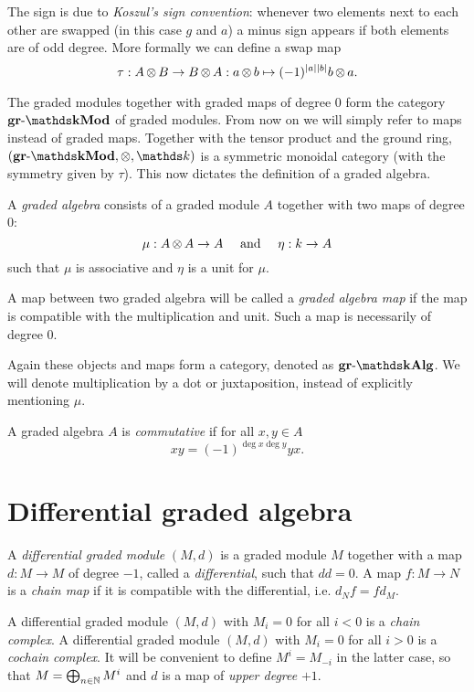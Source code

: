 The sign is due to \emph{Koszul's sign convention}: whenever two elements next to each other are swapped (in this case $g$ and $a$) a minus sign appears if both elements are of odd degree. More formally we can define a swap map
$$ \tau : A \operatorname*{\otimes} B \to B \operatorname*{\otimes} A : a \operatorname*{\otimes} b \mapsto (-1)^{{|{a}|}{|{b}|}} b \operatorname*{\otimes} a. $$

The graded modules together with graded maps of degree $0$ form the category $\grMod{\k}$ of graded modules. From now on we will simply refer to maps instead of graded maps. Together with the tensor product and the ground ring, $(\grMod{\k}, \tensor, \k)$ is a symmetric monoidal category (with the symmetry given by $\tau$). This now dictates the definition of a graded algebra.

\begin{definition}
	A \emph{graded algebra} consists of a graded module $A$ together with two maps of degree $0$:
	$$ \mu: A \operatorname*{\otimes} A \to A \quad\text{ and }\quad \eta: k \to A $$
	such that $\mu$ is associative and $\eta$ is a unit for $\mu$.

	A map between two graded algebra will be called a \emph{graded algebra map} if the map is compatible with the multiplication and unit. Such a map is necessarily of degree $0$.
\end{definition}

Again these objects and maps form a category, denoted as $\grAlg{\k}$. We will denote multiplication by a dot or juxtaposition, instead of explicitly mentioning $\mu$.

\begin{definition}
	A graded algebra $A$ is \emph{commutative} if for all $x, y \in A$
	$$ x y = (-1)^{\deg{x}\deg{y}} y x. $$
\end{definition}


\section{Differential graded algebra}

\begin{definition}
	A \emph{differential graded module} $(M, d)$ is a graded module $M$ together with a map $d: M \to M$ of degree $-1$, called a \emph{differential}, such that $dd = 0$. A map $f: M \to N$ is a \emph{chain map} if it is compatible with the differential, i.e. $d_N f = f d_M$.
\end{definition}

A differential graded module $(M, d)$ with $M_i = 0$ for all $i < 0$ is a \emph{chain complex}. A differential graded module $(M, d)$ with $M_i = 0$ for all $i > 0$ is a \emph{cochain complex}. It will be convenient to define $M^i = M_{-i}$ in the latter case, so that $M = \bigoplus_{n \in \mathbb{N}} M^i$ and $d$ is a map of \emph{upper degree} $+1$.

